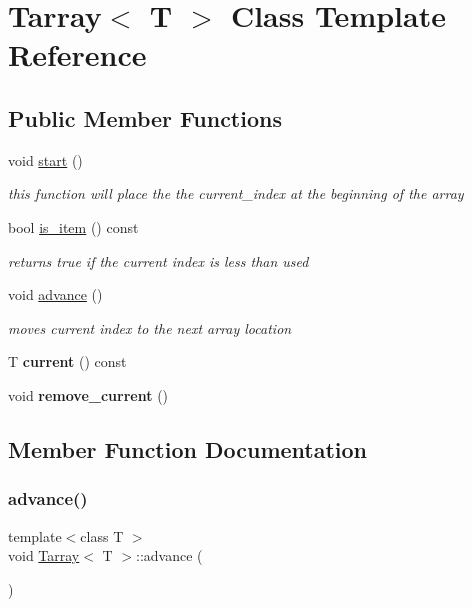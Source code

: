 \hypertarget{class_tarray}{}\section{Tarray$<$ T $>$ Class Template Reference}
\label{class_tarray}
\subsection*{Public Member Functions}
\begin{DoxyCompactItemize}
\item 
void \hyperlink{class_tarray_afdf48d2a03b6b1c110818998b6a86a38}{start} ()
\begin{DoxyCompactList}\small\item\em this function will place the the current\+\_\+index at the beginning of the array \end{DoxyCompactList}\item 
bool \hyperlink{class_tarray_ab4047d306cc681cee5b665f0cca887f1}{is\+\_\+item} () const
\begin{DoxyCompactList}\small\item\em returns true if the current index is less than used \end{DoxyCompactList}\item 
void \hyperlink{class_tarray_a5bd5dd08f5bfe1c2a5dab59ad7896ecf}{advance} ()
\begin{DoxyCompactList}\small\item\em moves current index to the next array location \end{DoxyCompactList}\item 
\mbox{\label{class_tarray_a60bc796c7843e2edaae82d42c15c4360}} 
T {\bfseries current} () const
\item 
\mbox{\label{class_tarray_af1728e8ed47a8de0fd3eedfa526b0c43}} 
void {\bfseries remove\+\_\+current} ()
\end{DoxyCompactItemize}


\subsection{Member Function Documentation}
\mbox{\label{class_tarray_a5bd5dd08f5bfe1c2a5dab59ad7896ecf}} 
\subsubsection{\texorpdfstring{advance()}{advance()}}
{\footnotesize\ttfamily template$<$class T $>$ \\
void \hyperlink{class_tarray}{Tarray}$<$ T $>$\+::advance (\begin{DoxyParamCaption}{ }\end{DoxyParamCaption})}



